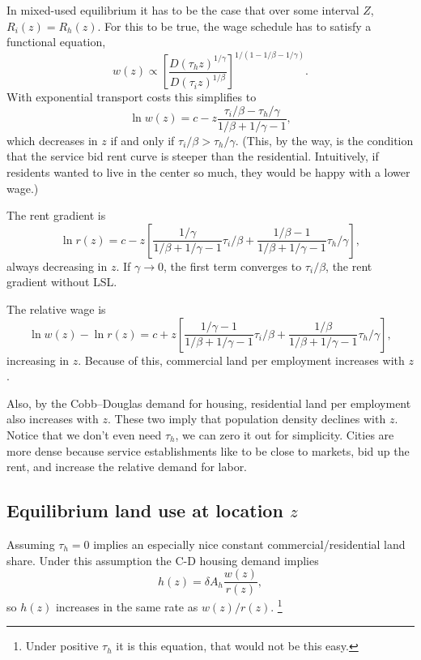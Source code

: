 \documentclass[10pt]{article}
\begin{document}
In mixed-used equilibrium it has to be the case that over some interval $Z$, $R_i(z)=R_h(z)$. For this to be true, the wage schedule has to satisfy a functional equation,
\[
w(z) \propto \left[\frac{D(\tau_hz)^{1/\gamma}}{D(\tau_iz)^{1/\beta}}\right]^{1/(1-1/\beta-1/\gamma)}.
\]
With exponential transport costs this simplifies to
\[
\ln w(z) = c - z\frac{\tau_i/\beta-\tau_h/\gamma}{1/\beta+1/\gamma-1},
\]
which decreases in $z$ if and only if $\tau_i/\beta > \tau_h/\gamma$. (This, by the way, is the condition that the service bid rent curve is steeper than the residential. Intuitively, if residents wanted to live in the center so much, they would be happy with a lower wage.)

The rent gradient is
\[
\ln r(z) = c - z\left[\frac{1/\gamma}{1/\beta+1/\gamma-1}\tau_i/\beta+
\frac{1/\beta-1}{1/\beta+1/\gamma-1}\tau_h/\gamma\right],
\]
always decreasing in $z$. If $\gamma\to 0$, the first term converges to $\tau_i/\beta$, the rent gradient without LSL.

The relative wage is
\[
\ln w(z) - \ln r(z) = c + z\left[\frac{1/\gamma-1}{1/\beta+1/\gamma-1}\tau_i/\beta+
\frac{1/\beta}{1/\beta+1/\gamma-1}\tau_h/\gamma\right],
\]
increasing in $z$. Because of this, commercial land per employment increases with $z$.

Also, by the Cobb--Douglas demand for housing, residential land per employment also increases with $z$. These two imply that population density declines with $z$. Notice that we don't even need $\tau_h$, we can zero it out for simplicity. Cities are more dense because service establishments like to be close to markets, bid up the rent, and increase the relative demand for labor.

\subsection{Equilibrium land use at location $z$}
Assuming $\tau_h=0$ implies an especially nice constant commercial/residential land share. Under this assumption the C-D housing demand implies
\begin{equation*}
h(z)=\delta A_h\frac{w(z)}{r(z)},
\end{equation*}
so $h(z)$ increases in the same rate as $w(z)/r(z)$. \footnote{Under positive $\tau_h$ it is this equation, that would not be this easy.}
\end{document}
